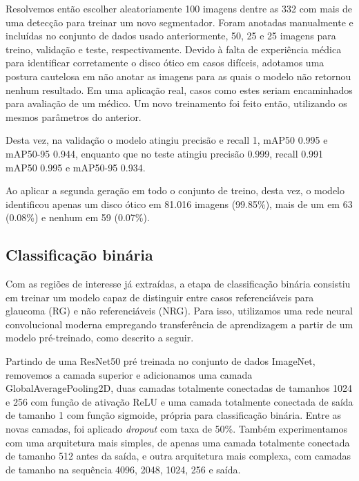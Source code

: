 \documentclass[12pt]{article}
\begin{document}
Resolvemos então escolher aleatoriamente 100 imagens dentre as 332 com mais de uma detecção para treinar um novo segmentador. Foram anotadas manualmente e incluídas no conjunto de dados usado anteriormente, 50, 25 e 25 imagens para treino, validação e teste, respectivamente. Devido à falta de experiência médica para identificar corretamente o disco ótico  em casos difíceis, adotamos uma postura cautelosa em não anotar as imagens para as quais o modelo não retornou nenhum resultado. Em uma aplicação real, casos como estes seriam encaminhados para avaliação de um médico. Um novo treinamento foi feito então, utilizando os mesmos parâmetros do anterior.

Desta vez, na validação o modelo atingiu precisão e recall 1, mAP50 0.995 e mAP50-95 0.944, enquanto que no teste atingiu precisão 0.999, recall 0.991 mAP50 0.995 e mAP50-95 0.934.

Ao aplicar a segunda geração em todo o conjunto de treino, desta vez, o modelo identificou apenas um disco ótico em 81.016 imagens (99.85\%), mais de um em 63 (0.08\%) e nenhum em 59 (0.07\%).



\subsection{Classificação binária}
\label{sec:binary_classification}

Com as regiões de interesse já extraídas, a etapa de classificação binária consistiu em treinar um modelo capaz de distinguir entre casos referenciáveis para glaucoma (RG) e não referenciáveis (NRG). Para isso, utilizamos uma rede neural convolucional moderna empregando transferência de aprendizagem a partir de um modelo pré-treinado, como descrito a seguir.

Partindo de uma ResNet50 pré treinada no conjunto de dados ImageNet, removemos a camada superior e adicionamos uma camada GlobalAveragePooling2D, duas camadas totalmente conectadas de tamanhos 1024 e 256 com função de ativação ReLU e uma camada totalmente conectada de saída de tamanho 1 com função sigmoide, própria para classificação binária. Entre as novas camadas, foi aplicado \emph{dropout} com taxa de 50\%. Também experimentamos com uma arquitetura mais simples, de apenas uma camada totalmente conectada de tamanho 512 antes da saída, e outra arquitetura mais complexa, com camadas de tamanho na sequência 4096, 2048, 1024, 256 e saída.
\end{document}
